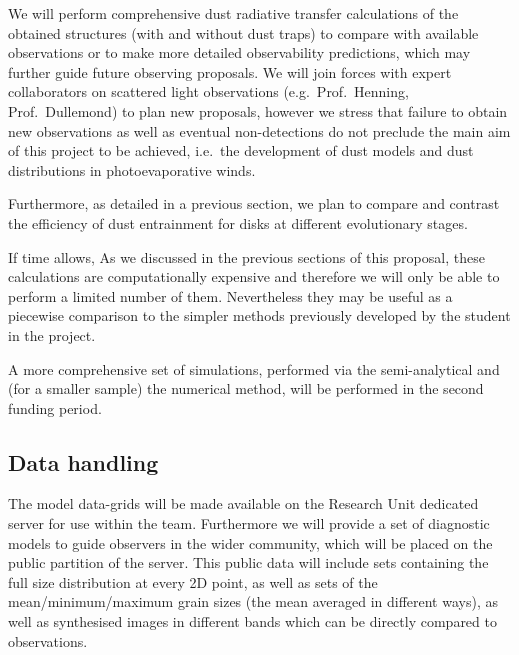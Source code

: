 \documentclass[10pt,fleqn,twoside]{article}
\begin{document}
We will perform comprehensive dust radiative transfer calculations of
the obtained structures (with and without dust traps) to compare with
available observations or to make more detailed observability
predictions, which may further guide future observing proposals. We
will join forces with expert collaborators on scattered light
observations (e.g.\ Prof.\ Henning, 
Prof.\ Dullemond) to
plan new proposals, however we stress that failure to obtain new
observations as well as eventual non-detections do not preclude the
main aim of this project to be achieved, i.e.\ the development
of dust models and dust distributions in photoevaporative winds. 

Furthermore, as detailed in a previous section, we plan to compare and contrast
the efficiency of dust entrainment for disks at different evolutionary
stages. 

If time allows,  As we discussed in the previous sections of this
proposal, these calculations are computationally expensive
and therefore we will only be able to perform a limited number of
them. Nevertheless they may be useful as a piecewise comparison to
the simpler methods previously developed by the student in the project.  

A more comprehensive set of simulations, performed via the
semi-analytical and (for a smaller sample) the numerical method, will be
performed in the second funding period. 

 
\vspace{0.5em}


\subsection{Data handling}

The model data-grids will be made available on the Research Unit
dedicated server for use within the team. Furthermore we will provide
a set of diagnostic models to guide observers in the wider community,
which will be placed 
on the public partition of the server.
This public data will include sets containing the full size
distribution at every 2D point, as well as sets of the
mean/minimum/maximum grain sizes (the mean averaged in different
ways), as well as synthesised images in different bands which can be
directly compared to observations. 
\end{document}
